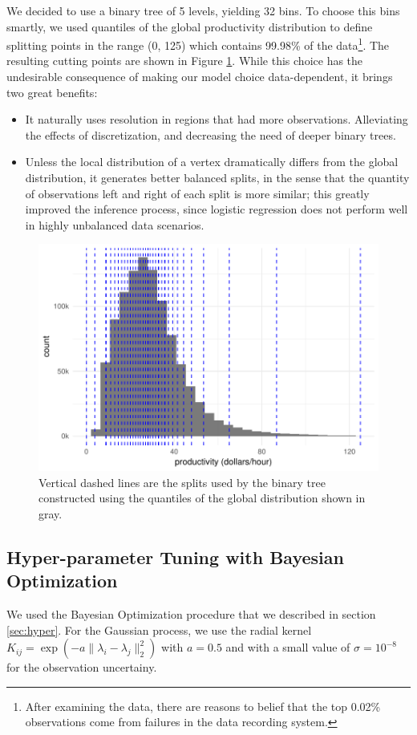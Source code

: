 \documentclass[a4paper, 11pt]{article}
\begin{document}
We decided to use a binary tree of 5 levels, yielding 32 bins. To choose this bins smartly, we used quantiles of the global productivity distribution to define splitting points in the range (0, 125) which contains 99.98\% of the data\footnote{After examining the data, there are reasons to belief that the top 0.02\% observations come from failures in the data recording system.}. The resulting cutting points are shown in Figure \ref{fig:splits}. While this choice has the undesirable consequence of making our model choice data-dependent, it brings two great benefits:
\begin{itemize}
    \itemsep0em
    \item It naturally uses resolution in regions that had more observations. Alleviating the effects of discretization, and decreasing the need of deeper binary trees.
    \item Unless the local distribution of a vertex dramatically differs from the global distribution, it generates better balanced splits, in the sense that the quantity of observations left and right of each split is more similar; this greatly improved the inference process, since logistic regression does not perform well in highly unbalanced data scenarios.
\end{itemize}

\begin{figure}[tb]
    \centering
    \includegraphics[width=0.55\linewidth]{img/splits.pdf}
    \caption{Vertical dashed lines are the splits used by the binary tree constructed using the quantiles of the global distribution shown in gray.}
    \label{fig:splits}
\end{figure}

\subsection{Hyper-parameter Tuning with Bayesian Optimization}

We used the Bayesian Optimization procedure that we described in section \ref{sec:hyper}. For the Gaussian process, we use the radial kernel $K_{ij}=\exp(-a \lVert \lambda_i - \lambda_j\rVert^2_2)$ with $a=0.5$ and with a small value of $\sigma=10^{-8}$ for the observation uncertainy.
\end{document}
